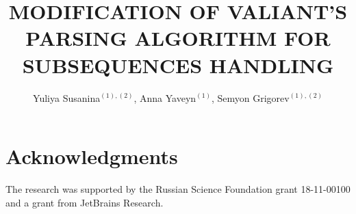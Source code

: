 \documentclass[12pt,a4paper]{cibb}
\title{\large $\ $\\ \bf  MODIFICATION OF VALIANT'S PARSING ALGORITHM FOR SUBSEQUENCES HANDLING}
\author{Yuliya Susanina$^{(1),(2)}$, Anna Yaveyn$^{(1)}$, Semyon Grigorev$^{(1),(2)}$}
\begin{document}
\thispagestyle{myheadings}
\pagestyle{myheadings}







\section*{\bf Acknowledgments}

The research was supported by the Russian Science Foundation grant 18-11-00100 and a grant from JetBrains Research.


%




\end{document}
